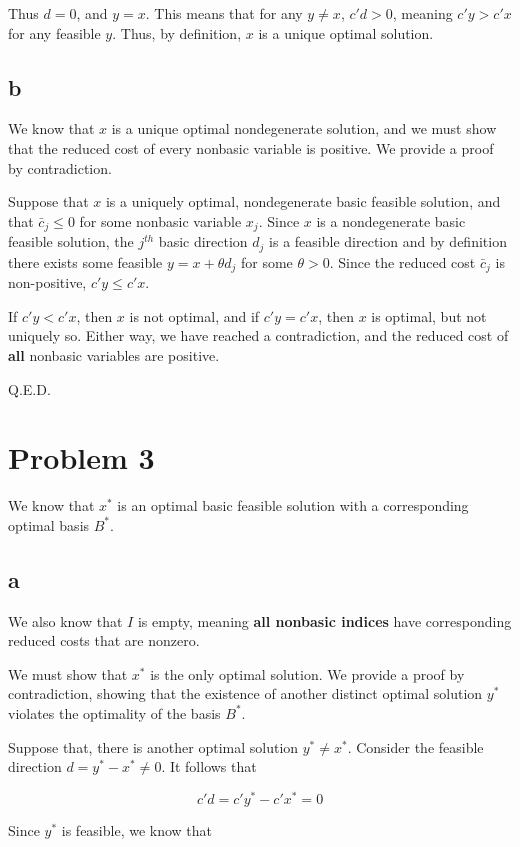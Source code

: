 \documentclass[11pt,a4paper]{article}
\begin{document}
Thus $d=0$, and $y=x$. This means that for any $y\neq x$, $c'd>0$, meaning $c'y>c'x$ for any feasible $y$. Thus, by definition, $x$ is a unique optimal solution.

\subsection*{b}

We know that $x$ is a unique optimal nondegenerate solution, and we must show that the reduced cost of every nonbasic variable is positive. We provide a proof by contradiction.

Suppose that $x$ is a uniquely optimal, nondegenerate basic feasible solution, and that $\bar{c}_j\leq 0$ for some nonbasic variable $x_j$. Since $x$ is a nondegenerate basic feasible solution, the $j^{th}$ basic direction $d_j$ is a feasible direction and by definition there exists some feasible $y=x+\theta d_j$ for some $\theta > 0$. Since the reduced cost $\bar{c}_j$ is non-positive, $c'y\leq c'x$.

If $c'y<c'x$, then $x$ is not optimal, and if $c'y=c'x$, then $x$ is optimal, but not uniquely so. Either way, we have reached a contradiction, and the reduced cost of \textbf{all} nonbasic variables are positive. 

Q.E.D.

\section*{Problem 3}

We know that $x^*$ is an optimal basic feasible solution with a corresponding optimal basis $B^*$. 

\subsection*{a}
We also know that $I$ is empty, meaning \textbf{all nonbasic indices} have corresponding reduced costs that are nonzero. 

We must show that $x^*$ is the only optimal solution. We provide a proof by contradiction, showing that the existence of another distinct optimal solution $y^*$ violates the optimality of the basis $B^*$.

Suppose that, there is another optimal solution $y^*\neq x^*$. Consider the feasible direction $d=y^*-x^*\neq0$. It follows that

$$
c'd=c'y^*-c'x^*=0
$$

Since $y^*$ is feasible, we know that
\end{document}
